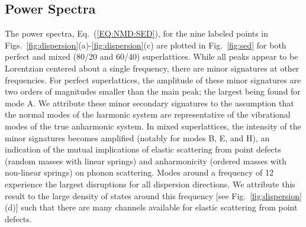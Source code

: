 \documentclass[aps,prb,preprint,preprintnumbers,amsmath,amssymb,floatfix,superscriptaddress]{revtex4}
\begin{document}
\subsection{Power Spectra}

The power spectra, Eq.~(\ref{EQ:NMD:SED}), for the nine labeled points in Figs.~\ref{fig:dispersion}(a)-\ref{fig:dispersion}(c) are plotted in Fig.~\ref{fig:sed} for both perfect and mixed (80/20 and 60/40) superlattices. While all peaks appear to be Lorentzian centered about a single frequency, there are minor signatures at other frequencies. For perfect superlattices, the amplitude of these minor signatures are two orders of magnitudes smaller than the main peak; the largest being found for mode A. We attribute these minor secondary signatures to the assumption that the normal modes of the harmonic system are representative of the vibrational modes of the true anharmonic system. In mixed superlattices, the intensity of the minor signatures becomes amplified (notably for modes B, E, and H), an indication of the mutual implications of elastic scattering from point defects (random masses with linear springs) and anharmonicity (ordered masses with non-linear springs) on phonon scattering. \cite{RevModPhys.53.175}  Modes around a frequency of 12 experience the largest disruptions for all dispersion directions. We attribute this result to the large density of states around this frequency [see Fig.~\ref{fig:dispersion}(d)] such that there are many channels available for elastic scattering from point defects.\cite{tamura_isotope_1983} 
\end{document}
